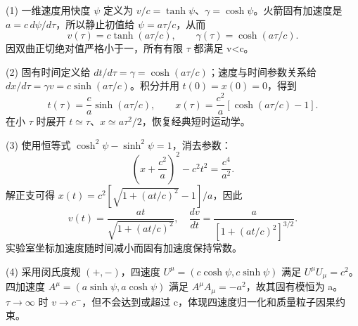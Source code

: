 (1) 一维速度用快度 \(\psi\) 定义为 \(v/c=\tanh\psi\)、\(\gamma=\cosh\psi\)。火箭固有加速度是 \(a=c\,d\psi/d\tau\)，所以静止初值给 \(\psi=a\tau/c\)，从而
\[
v(\tau)=c\tanh(a\tau/c),\qquad \gamma(\tau)=\cosh(a\tau/c).
\]
因双曲正切绝对值严格小于一，所有有限 \(\tau \) 都满足 v<c。

(2) 固有时间定义给 \(dt/d\tau=\gamma=\cosh(a\tau/c)\)；速度与时间参数关系给 \(dx/d\tau=\gamma v=c\sinh(a\tau/c)\)。积分并用 \(t(0)=x(0)=0\)，得到
\[
t(\tau)=\frac ca\sinh(a\tau/c),\qquad
x(\tau)=\frac{c^2}{a}[\cosh(a\tau/c)-1].
\]
在小 \(\tau \) 时展开 \(t\simeq\tau\)、\(x\simeq a\tau^2/2\)，恢复经典短时运动学。

(3) 使用恒等式 \(\cosh^2\psi-\sinh^2\psi=1\)，消去参数：
\[
\left(x+\frac{c^2}{a}\right)^2-c^2t^2=\frac{c^4}{a^2}.
\]
解正支可得 \(x(t)=c^2[\sqrt{1+(at/c)^2}-1]/a\)，因此
\[
v(t)=\frac{at}{\sqrt{1+(at/c)^2}},\quad
\frac{dv}{dt}=\frac a{[1+(at/c)^2]^{3/2}}.
\]
实验室坐标加速度随时间减小而固有加速度保持常数。

(4) 采用闵氏度规 \((+,-)\)，四速度 \(U^\mu=(c\cosh\psi,c\sinh\psi)\) 满足 \(U^\mu U_\mu=c^2\)。四加速度 \(A^\mu=(a\sinh\psi,a\cosh\psi)\) 满足 \(A^\mu A_\mu=-a^2\)，故其固有模恒为 a。\(\tau \to \infty \) 时 \(v\to c^-\)，但不会达到或超过 c，体现四速度归一化和质量粒子因果约束。
